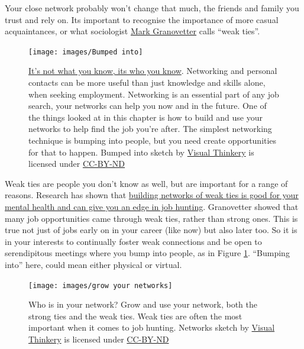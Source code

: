\documentclass[
]{book}
\begin{document}
Your close network probably won't change that much, the friends and family you trust and rely on. Its important to recognise the importance of more casual acquaintances, or what sociologist \href{https://en.wikipedia.org/wiki/Mark_Granovetter}{Mark Granovetter} calls ``weak ties''. \citep{granovetter}

\begin{figure}

{\centering \texttt{[image: images/Bumped into]} 

}

\caption{\href{https://en.wiktionary.org/wiki/it\%27s_not_what_you_know_but_who_you_know}{It's not what you know, its who you know}. Networking and personal contacts can be more useful than just knowledge and skills alone, when seeking employment. Networking is an essential part of any job search, your networks can help you now and in the future. One of the things looked at in this chapter is how to build and use your networks to help find the job you're after. The simplest networking technique is bumping into people, but you need create opportunities for that to happen. Bumped into sketch by \href{https://visualthinkery.com/}{Visual Thinkery} is licensed under \href{https://creativecommons.org/licenses/by-nd/4.0/}{CC-BY-ND}}\label{fig:bumped-fig}
\end{figure}



Weak ties are people you don't know as well, but are important for a range of reasons. Research has shown that \href{https://www.bbc.com/worklife/article/20200701-why-your-weak-tie-friendships-may-mean-more-than-you-think}{building networks of weak ties is good for your mental health and can give you an edge in job hunting}. \citep{weakties} Granovetter showed that many job opportunities came through weak ties, rather than strong ones. This is true not just of jobs early on in your career (like now) but also later too. So it is in your interests to continually foster weak connections and be open to serendipitous meetings where you bump into people, as in Figure \ref{fig:bumped-fig}. ``Bumping into'' here, could mean either physical or virtual.

\begin{figure}

{\centering \texttt{[image: images/grow your networks]} 

}

\caption{Who is in your network? Grow and use your network, both the strong ties and the weak ties. Weak ties are often the most important when it comes to job hunting. Networks sketch by \href{https://visualthinkery.com/}{Visual Thinkery} is licensed under \href{https://creativecommons.org/licenses/by-nd/4.0/}{CC-BY-ND}}\label{fig:net-fig}
\end{figure}
\end{document}
